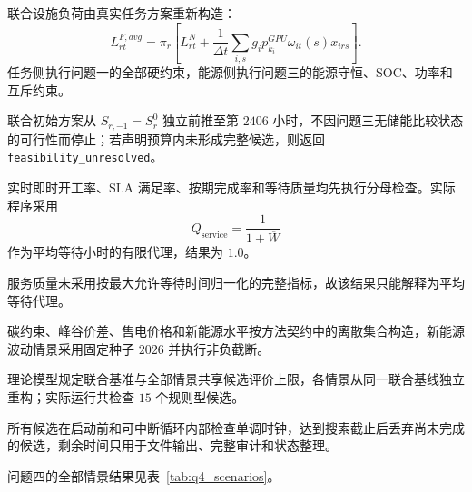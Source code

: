 \documentclass[withoutpreface,bwprint]{cumcmthesis}
\begin{document}
联合设施负荷由真实任务方案重新构造：
\begin{equation}
L_{rt}^{F,avg}=\pi_r\left[
L_{rt}^{N}+\frac{1}{\Delta t}
\sum_{i,s}g_ip_{k_i}^{GPU}\omega_{it}(s)x_{irs}
\right].
\end{equation}
任务侧执行问题一的全部硬约束，能源侧执行问题三的能源守恒、SOC、功率和互斥约束。

联合初始方案从 $S_{r,-1}=S_r^0$ 独立前推至第 $2406$ 小时，不因问题三无储能比较状态的可行性而停止；若声明预算内未形成完整候选，则返回 \texttt{feasibility\_unresolved}。

实时即时开工率、SLA 满足率、按期完成率和等待质量均先执行分母检查。实际程序采用
\begin{equation}
Q_{\mathrm{service}}=\frac{1}{1+\overline W}
\end{equation}
作为平均等待小时的有限代理，结果为 $1.0$。

服务质量未采用按最大允许等待时间归一化的完整指标，故该结果只能解释为平均等待代理。

碳约束、峰谷价差、售电价格和新能源水平按方法契约中的离散集合构造，新能源波动情景采用固定种子 $2026$ 并执行非负截断。

理论模型规定联合基准与全部情景共享候选评价上限，各情景从同一联合基线独立重构；实际运行共检查 $15$ 个规则型候选。

所有候选在启动前和可中断循环内部检查单调时钟，达到搜索截止后丢弃尚未完成的候选，剩余时间只用于文件输出、完整审计和状态整理。

问题四的全部情景结果见表~\ref{tab:q4_scenarios}。
\end{document}
